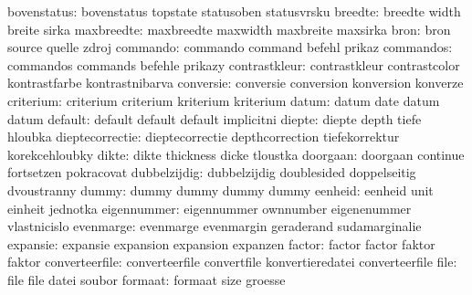         bovenstatus:  bovenstatus          topstate             statusoben
                       statusvrsku
             breedte:  breedte              width                breite
                       sirka
          maxbreedte:  maxbreedte           maxwidth             maxbreite
                       maxsirka
                bron:  bron                 source               quelle
                       zdroj
            commando:  commando             command              befehl
                       prikaz
           commandos:  commandos            commands             befehle
                       prikazy
       contrastkleur:  contrastkleur        contrastcolor        kontrastfarbe
                       kontrastnibarva
           conversie:  conversie            conversion           konversion
                       konverze
           criterium:  criterium            criterium            kriterium
                       kriterium
               datum:  datum                date                 datum
                       datum
             default:  default              default              default
                       implicitni
              diepte:  diepte               depth                tiefe
                       hloubka
     dieptecorrectie:  dieptecorrectie      depthcorrection      tiefekorrektur
                       korekcehloubky
               dikte:  dikte                thickness            dicke
                       tloustka
            doorgaan:  doorgaan             continue             fortsetzen
                       pokracovat
        dubbelzijdig:  dubbelzijdig         doublesided          doppelseitig
                       dvoustranny
               dummy:  dummy                dummy                dummy
                       dummy
             eenheid:  eenheid              unit                 einheit
                       jednotka
         eigennummer:  eigennummer          ownnumber            eigenenummer
                       vlastnicislo
           evenmarge:  evenmarge            evenmargin           geraderand
                       sudamarginalie
            expansie:  expansie             expansion            expansion
                       expanzen
              factor:  factor               factor               faktor
                       faktor
      converteerfile:  converteerfile       convertfile          konvertieredatei
                       converteerfile %
                file:  file                 file                 datei
                       soubor
             formaat:  formaat              size                 groesse
